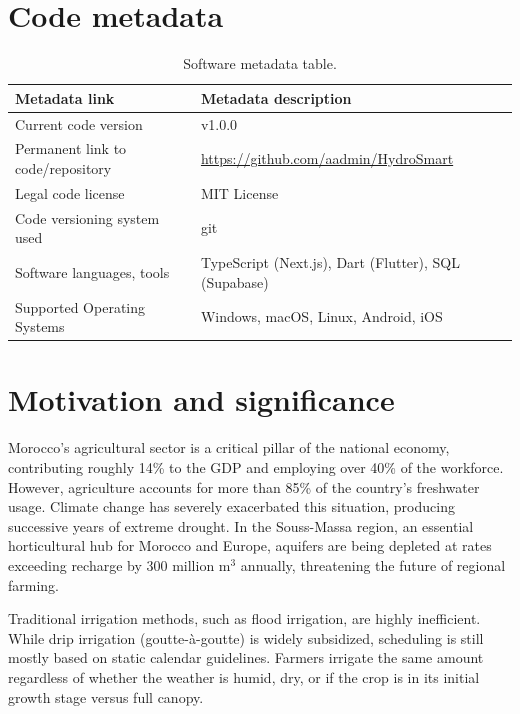 \documentclass[3p,twocolumn]{elsarticle}
\begin{document}
\section*{Code metadata}
\label{}

\begin{table}[h!]
\small
\begin{tabular}{lp{4.5cm}}
\toprule
\textbf{Metadata link} & \textbf{Metadata description} \\
\midrule
Current code version & v1.0.0 \\
Permanent link to code/repository & \url{https://github.com/aadmin/HydroSmart} \\
Legal code license & MIT License \\
Code versioning system used & git \\
Software languages, tools & TypeScript (Next.js), Dart (Flutter), SQL (Supabase) \\
Supported Operating Systems & Windows, macOS, Linux, Android, iOS \\
\bottomrule
\end{tabular}
\caption{Software metadata table.}
\label{table:metadata}
\end{table}

\section{Motivation and significance}
Morocco's agricultural sector is a critical pillar of the national economy, contributing roughly 14\% to the GDP and employing over 40\% of the workforce. However, agriculture accounts for more than 85\% of the country's freshwater usage. Climate change has severely exacerbated this situation, producing successive years of extreme drought. In the Souss-Massa region, an essential horticultural hub for Morocco and Europe, aquifers are being depleted at rates exceeding recharge by 300 million $\text{m}^3$ annually, threatening the future of regional farming.

Traditional irrigation methods, such as flood irrigation, are highly inefficient. While drip irrigation (goutte-à-goutte) is widely subsidized, scheduling is still mostly based on static calendar guidelines. Farmers irrigate the same amount regardless of whether the weather is humid, dry, or if the crop is in its initial growth stage versus full canopy.
\end{document}

